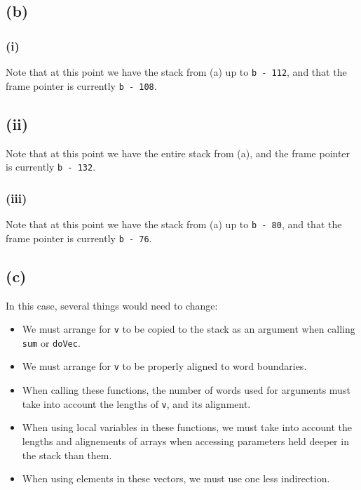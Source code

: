 \subsection{(b)}
\subsubsection{(i)}
Note that at this point we have the stack from (a) up to \texttt{b - 112}, and that the frame pointer is currently \texttt{b - 108}.

\subsection{(ii)}
Note that at this point we have the entire stack from (a), and the frame pointer is currently \texttt{b - 132}.

\subsubsection{(iii)}
Note that at this point we have the stack from (a) up to \texttt{b - 80}, and that the frame pointer is currently \texttt{b - 76}.

\subsection{(c)}
In this case, several things would need to change:
\begin{itemize}

\item We must arrange for \texttt{v} to be copied to the stack as an argument when calling \texttt{sum} or \texttt{doVec}.
\item We must arrange for \texttt{v} to be properly aligned to word boundaries.
\item When calling these functions, the number of words used for arguments must take into account the lengths of \texttt{v}, and its alignment.
\item When using local variables in these functions, we must take into account the lengths and alignements of arrays when accessing parameters held deeper in the stack than them.
\item When using elements in these vectors, we must use one less indirection.

\end{itemize}

